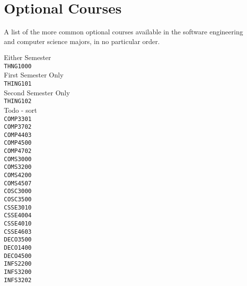 \section{Optional Courses}

\paragraph{} A list of the more common optional courses available in the software engineering and computer science majors, in no particular order.

\centering
Either Semester \\
\texttt{THNG1000} \\
First Semester Only \\
\texttt{THING101} \\
Second Semester Only \\
\texttt{THING102} \\
Todo - sort \\
\texttt{COMP3301} \\
\texttt{COMP3702} \\
\texttt{COMP4403} \\
\texttt{COMP4500} \\
\texttt{COMP4702} \\
\texttt{COMS3000} \\
\texttt{COMS3200} \\
\texttt{COMS4200} \\
\texttt{COMS4507} \\
\texttt{COSC3000} \\
\texttt{COSC3500} \\
\texttt{CSSE3010} \\
\texttt{CSSE4004} \\
\texttt{CSSE4010} \\
\texttt{CSSE4603} \\
\texttt{DECO3500} \\
\texttt{DECO1400} \\
\texttt{DECO4500} \\
\texttt{INFS2200} \\
\texttt{INFS3200} \\
\texttt{INFS3202} \\

